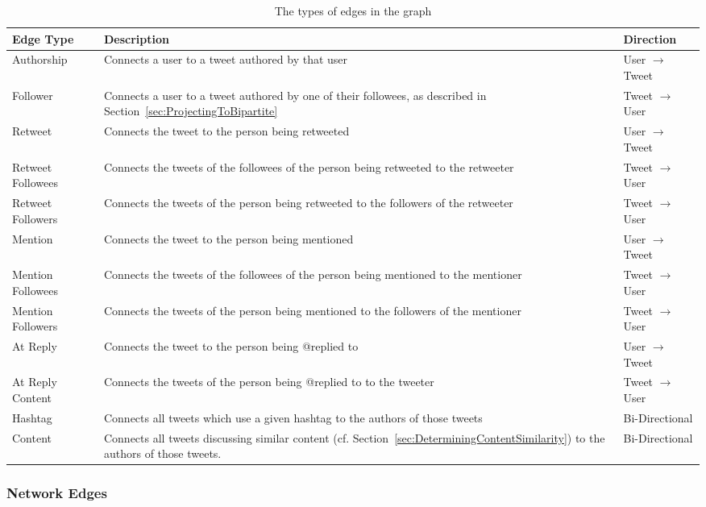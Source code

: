 \begin{table}
\centering
\begin{tabular}{p{1.9cm}|p{9cm}|p{1.9cm}}
{\bf Edge Type} & {\bf Description} & {\bf Direction} \\ \hline
Authorship & Connects a user to a tweet authored by that user & User $\rightarrow$ Tweet \\ \hline
Follower & Connects a user to a tweet authored by one of their followees, as described in Section~\ref{sec:ProjectingToBipartite} & Tweet $\rightarrow$ User \\ \hline
Retweet & Connects the tweet to the person being retweeted & User $\rightarrow$ Tweet \\ \hline
Retweet Followees & Connects the tweets of the followees of the person being retweeted to the retweeter & Tweet $\rightarrow$ User \\ \hline
Retweet Followers & Connects the tweets of the person being retweeted to the followers of the retweeter & Tweet $\rightarrow$ User \\ \hline
Mention & Connects the tweet to the person being mentioned & User $\rightarrow$ Tweet \\ \hline
Mention Followees & Connects the tweets of the followees of the person being mentioned to the mentioner & Tweet $\rightarrow$ User \\ \hline
Mention Followers & Connects the tweets of the person being mentioned to the followers of the mentioner & Tweet $\rightarrow$ User \\ \hline
At Reply & Connects the tweet to the person being @replied to & User $\rightarrow$ Tweet \\ \hline
At Reply Content & Connects the tweets of the person being @replied to to the tweeter & Tweet $\rightarrow$ User \\ \hline
Hashtag & Connects all tweets which use a given hashtag to the authors of those tweets & Bi-Directional \\ \hline
Content & Connects all tweets discussing similar content (cf. Section~\ref{sec:DeterminingContentSimilarity}) to the authors of those tweets. & Bi-Directional \\
\end{tabular}
\caption{The types of edges in the graph}
\label{tab:EdgeTypes}
\end{table}


\subsubsection{Network Edges}

